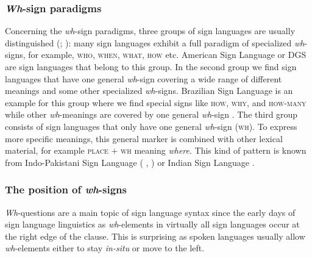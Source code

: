\subsubsection{\textit{Wh}-sign paradigms}
Concerning the \textit{wh}-sign paradigms, three groups of sign languages are usually distinguished (\citealt{zeshan2004interrogative}; \citealt[295--296]{signgram2017}): many sign languages exhibit a full paradigm of specialized \textit{wh}-signs, for example, \textsc{who}, \textsc{when}, \textsc{what}, \textsc{how} etc. American Sign Language or DGS are sign languages that belong to this group. In the second group we find sign languages that have one general \textit{wh}-sign covering a wide range of different meanings and some other specialized \textit{wh}-signs. Brazilian Sign Language is an example for this group where we find special signs like \textsc{how}, \textsc{why}, and \textsc{how-many} while other \textit{wh}-meanings are covered by one general \textit{wh}-sign \citep{de2006questions}. The third group consists of sign languages that only have one general \textit{wh}-sign (\textsc{wh}). To express more specific meanings, this general marker is combined with other lexical material, for example \textsc{place} $+$ \textsc{wh} meaning \textit{where}. This kind of pattern is known from Indo-Pakistani Sign Language (\citeauthor{zeshan2004interrogative} \citeyear{zeshan2004interrogative}, \citeyear{zeshan2006negative}) or Indian Sign Language \citep{aboh2006wh}.


\subsubsection{The position of \textit{wh}-signs}
\textit{Wh}-questions are a main topic of sign language syntax since the early days of sign language linguistics as \textit{wh}-elements in virtually all sign languages occur at the right edge of the clause. This is surprising as spoken languages usually allow \textit{wh}-elements either to stay \textit{in-situ} or move to the left. 

